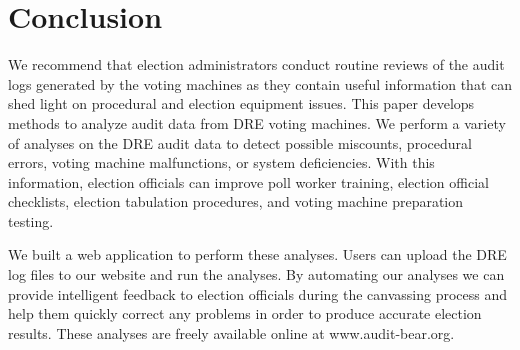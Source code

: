 \section{Conclusion}
We recommend that election administrators conduct routine reviews of the audit
logs generated by the voting machines as they contain useful information that
can shed light on procedural and election equipment issues. This paper develops
methods to analyze audit data from DRE voting machines. We perform a variety of
analyses 
on the DRE audit data to detect possible miscounts, procedural errors, voting
machine malfunctions, or system deficiencies. With this information, election
officials can improve poll worker training, election official checklists,
election tabulation procedures, and voting machine preparation testing.

We built a web application to perform these analyses. Users can upload the DRE
log files to our website and run the analyses. By 
automating our analyses we can provide intelligent feedback to election
officials during the canvassing process and help them quickly correct any
problems in order to produce accurate election results. These analyses are
freely available online at www.audit-bear.org.

